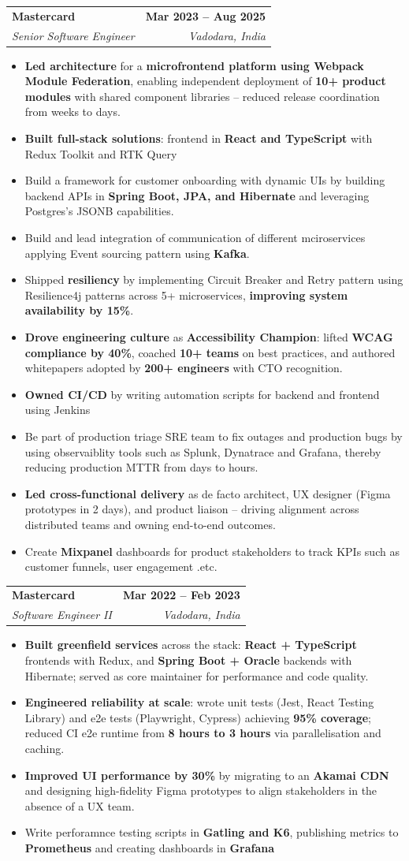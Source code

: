 \documentclass[letterpaper,11pt]{article}
\makeatletter
\newcommand{\resumeItem}[1]{
  \item\small{
    {#1 \vspace{-3pt}}
  }
}
\newcommand{\resumeSubheading}[4]{
  \vspace{-3pt}\item
    \begin{tabular*}{1.0\textwidth}[t]{l@{\extracolsep{\fill}}r}
      \textbf{#1} & \textbf{\small #2} \\
      \textit{\small#3} & \textit{\small #4} \\
    \end{tabular*}\vspace{-7pt}
}
\newcommand{\resumeItemListStart}{\begin{itemize}}
\newcommand{\resumeItemListEnd}{\end{itemize}\vspace{0pt}}
\makeatother
\begin{document}
    \resumeSubheading
      {Mastercard}{Mar 2023 -- Aug 2025}
      {Senior Software Engineer}{Vadodara, India}
      \resumeItemListStart
        \resumeItem{\textbf{Led architecture} for a \textbf{microfrontend platform using Webpack Module Federation}, enabling independent deployment of \textbf{10+ product modules} with shared component libraries -- reduced release coordination from weeks to days.}
        \resumeItem{\textbf{Built full-stack solutions}: frontend in \textbf{React and TypeScript} with Redux Toolkit and RTK Query}
        \resumeItem{
        Build a framework for customer onboarding with dynamic UIs by building backend APIs in \textbf{Spring Boot, JPA, and Hibernate} and leveraging Postgres's JSONB capabilities. }
        \resumeItem{Build and lead integration of communication of different mciroservices applying Event sourcing pattern using \textbf{Kafka}.}
        \resumeItem{Shipped \textbf{resiliency} by implementing Circuit Breaker and Retry pattern using Resilience4j patterns across 5+ microservices, \textbf{improving system availability by 15\%}.}
        \resumeItem{\textbf{Drove engineering culture} as \textbf{Accessibility Champion}: lifted \textbf{WCAG compliance by 40\%}, coached \textbf{10+ teams} on best practices, and authored whitepapers adopted by \textbf{200+ engineers} with CTO recognition.}
        \resumeItem{\textbf{Owned CI/CD} by writing automation scripts for backend and frontend using Jenkins}
        \resumeItem{Be part of production triage SRE team to fix outages and production bugs by using observaiblity tools such as Splunk, Dynatrace and Grafana, thereby reducing production MTTR from days to hours.}
        \resumeItem{\textbf{Led cross-functional delivery} as de facto architect, UX designer (Figma prototypes in 2 days), and product liaison -- driving alignment across distributed teams and owning end-to-end outcomes.}
        \resumeItem{Create \textbf{Mixpanel} dashboards for product stakeholders to track KPIs such as customer funnels, user engagement .etc.}
      \resumeItemListEnd

    \resumeSubheading
      {Mastercard}{Mar 2022 -- Feb 2023}
      {Software Engineer II}{Vadodara, India}
      \resumeItemListStart
        \resumeItem{\textbf{Built greenfield services} across the stack: \textbf{React + TypeScript} frontends with Redux, and \textbf{Spring Boot + Oracle} backends with Hibernate; served as core maintainer for performance and code quality.}
        \resumeItem{\textbf{Engineered reliability at scale}: wrote unit tests (Jest, React Testing Library) and e2e tests (Playwright, Cypress) achieving \textbf{95\% coverage}; reduced CI e2e runtime from \textbf{8 hours to 3 hours} via parallelisation and caching.}
        \resumeItem{\textbf{Improved UI performance by 30\%} by migrating to an \textbf{Akamai CDN} and designing high-fidelity Figma prototypes to align stakeholders in the absence of a UX team.}
        \resumeItem{Write perforamnce testing scripts in \textbf{Gatling and K6}, publishing metrics to \textbf{Prometheus} and creating dashboards in \textbf{Grafana}}
      \resumeItemListEnd
\end{document}

